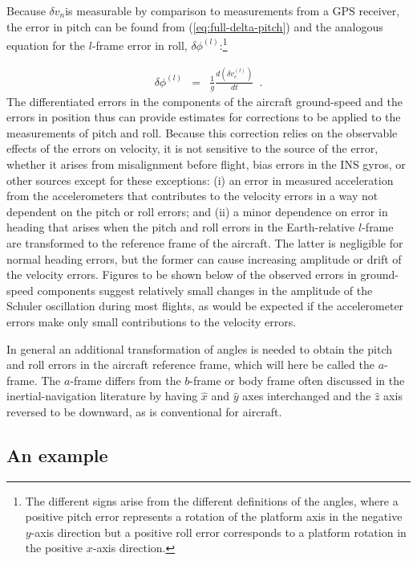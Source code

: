 \documentclass[english,british,amt,bookmarks=false,unicode=true]{copernicus}\usepackage[]{graphicx}\usepackage[]{color}
\begin{document}
Because $\delta v_{n}$is measurable by comparison to measurements
from a GPS receiver, the error in pitch can be found from (\ref{eq:full-delta-pitch})
and the analogous equation for the $l$-frame error in roll, $\delta\phi^{(l)}$:\footnote{The different signs arise from the different definitions of the angles,
where a positive pitch error represents a rotation of the platform
axis in the negative $y$-axis direction but a positive roll error
corresponds to a platform rotation in the positive $x$-axis direction.}

\begin{eqnarray}
\delta\phi^{(l)} & = & \frac{1}{g}\frac{d(\delta v_{e}^{(l)})}{dt}\,\,\,.\label{eq:delta-phi}
\end{eqnarray}
The differentiated errors in the components of the aircraft ground-speed
and the errors in position thus can provide estimates for corrections
to be applied to the measurements of pitch and roll. Because this
correction relies on the observable effects of the errors on velocity,
it is not sensitive to the source of the error, whether it arises
from misalignment before flight, bias errors in the INS gyros, or
other sources except for these exceptions: (i) an error in measured
acceleration from the accelerometers that contributes to the velocity
errors in a way not dependent on the pitch or roll errors; and (ii)
a minor dependence on error in heading that arises when the pitch
and roll errors in the Earth-relative $l$-frame are transformed to
the reference frame of the aircraft. The latter is negligible for
normal heading errors, but the former can cause increasing amplitude
or drift of the velocity errors. Figures to be shown below of the
observed errors in ground-speed components suggest relatively small
changes in the amplitude of the Schuler oscillation during most flights,
as would be expected if the accelerometer errors make only small contributions
to the velocity errors.

In general an additional transformation of angles is needed to obtain
the pitch and roll errors in the aircraft reference frame, which will
here be called the $a$-frame. The $a$-frame differs from the $b$-frame
or body frame often discussed in the inertial-navigation literature
by having $\hat{x}$ and $\hat{y}$ axes interchanged and the $\hat{z}$
axis reversed to be downward, as is conventional for aircraft.


\subsection{An example}
\end{document}
